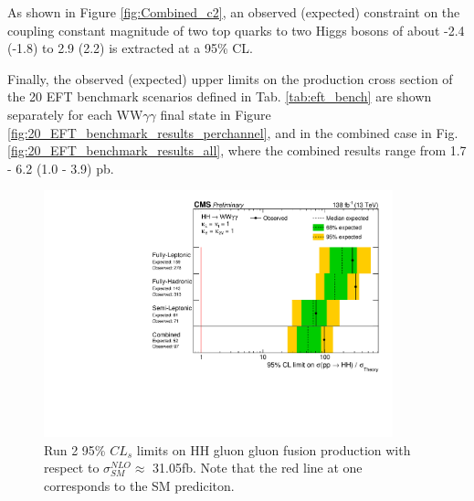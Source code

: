 As shown in Figure \ref{fig:Combined_c2}, an observed (expected) constraint on the coupling constant magnitude of two top quarks to two Higgs bosons of about
-2.4 (-1.8) to 2.9 (2.2) is extracted at a 95\% CL.

Finally, the observed (expected) upper limits on the production cross section of the 20 EFT benchmark scenarios defined in Tab. \ref{tab:eft_bench} are shown separately for each WW$\gamma\gamma$ final state in Figure \ref{fig:20_EFT_benchmark_results_perchannel}, and in the combined case in 
Fig.\ref{fig:20_EFT_benchmark_results_all}, where the combined results range from 1.7 - 6.2 (1.0 - 3.9) pb. 

\begin{figure}[!htbp]
  \centering
  \includegraphics[width=0.9\textwidth]{Sections/HHWWgg/images/Results/All_limits.pdf}
  \caption{Run 2 95\% $CL_{s}$ limits on HH gluon gluon fusion production with respect to $\sigma_{SM}^{NLO} \approx $ 31.05fb. Note that the red line at one corresponds to the SM prediciton.}
  \label{fig:Run2SMNLOCombined}
\end{figure}

